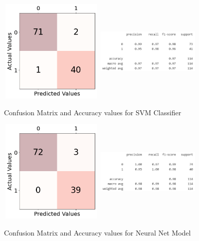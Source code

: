 \documentclass[10pt,twocolumn,letterpaper]{article}
\begin{document}
\begin{figure}[!ht]
    \centering
    \includegraphics[width=5cm, height=5cm, keepaspectratio]{Images/output7.png}
    \includegraphics[width=5cm, height=5cm, keepaspectratio]{Images/Picture12.png}
    \caption{Confusion Matrix and Accuracy values for SVM Classifier}
    \label{fig:my_label}
\end{figure}

\begin{figure}[!ht]
    \centering
    \includegraphics[width=5cm, height=5cm, keepaspectratio]{Images/output8.png}
    \includegraphics[width=5cm, height=5cm, keepaspectratio]{Images/Picture14.png}
    \caption{Confusion Matrix and Accuracy values for Neural Net Model}
    \label{fig:my_label}
\end{figure}
\end{document}
